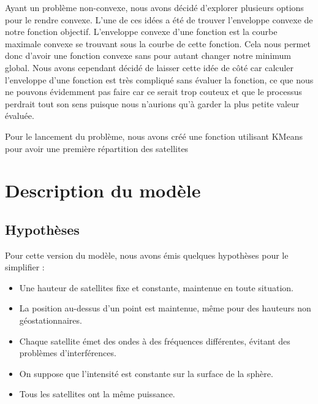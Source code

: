 \documentclass[a4paper]{article}
\begin{document}

Ayant un problème non-convexe, nous avons décidé d'explorer plusieurs options pour le rendre convexe. L'une de ces idées a été de trouver l'enveloppe convexe de notre fonction objectif. L'enveloppe convexe d'une fonction est la courbe maximale convexe se trouvant sous la courbe de cette fonction. Cela nous permet donc d'avoir une fonction convexe sans pour autant changer notre minimum global. Nous avons cependant décidé de laisser cette idée de côté car calculer l'enveloppe d'une fonction est très compliqué sans évaluer la fonction, ce que nous ne pouvons évidemment pas faire car ce serait trop couteux et que le processus perdrait tout son sens puisque nous n'aurions qu'à garder la plus petite valeur évaluée.

Pour le lancement du problème, nous avons créé une fonction utilisant KMeans pour avoir une première répartition des satellites



\section{Description du modèle}

\subsection{Hypothèses}
Pour cette version du modèle, nous avons émis quelques hypothèses pour le simplifier :

\begin{itemize}

    \item Une hauteur de satellites fixe et constante, maintenue en toute situation.
    \item La position au-dessus d'un point est maintenue, même pour des hauteurs non géostationnaires.
    \item Chaque satellite émet des ondes à des fréquences différentes, évitant des problèmes d'interférences.
    \item On suppose que l'intensité est constante sur la surface de la sphère.
    \item Tous les satellites ont la même puissance.
\end{itemize} 
\end{document}
